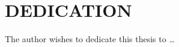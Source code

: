 \newpage
\chapter*{DEDICATION}
\thispagestyle{plain}
The author wishes to dedicate this thesis to \dots
